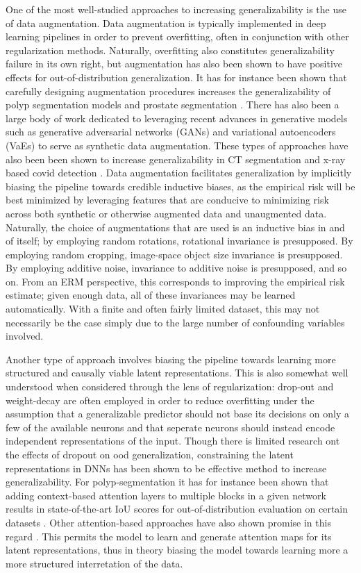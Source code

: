 	One of the most well-studied approaches to increasing generalizability is the use of data augmentation. Data augmentation is typically implemented in deep learning pipelines in order to prevent overfitting, often in conjunction with other regularization methods. Naturally, overfitting also constitutes generalizability failure in its own right, but augmentation has also been shown to have positive effects for out-of-distribution generalization. It has for instance been shown that carefully designing augmentation procedures increases the generalizability of polyp segmentation models \cite{polyp_augmentation} and prostate segmentation \cite{augmentation_prostate}. There has also been a large body of work dedicated to leveraging recent advances in generative models such as generative adversarial networks (GANs) and variational autoencoders (VaEs) to serve as synthetic data augmentation. These types of approaches have also been been shown to increase generalizability in CT segmentation \cite{cyclegan} and x-ray based covid detection \cite{covid}. Data augmentation facilitates generalization by implicitly biasing the pipeline towards credible inductive biases, as the empirical risk will be best minimized by leveraging features that are conducive to minimizing risk across both synthetic or otherwise augmented data and unaugmented data. Naturally, the choice of augmentations that are used is an inductive bias in and of itself; by employing random rotations, rotational invariance is presupposed. By employing random cropping, image-space object size invariance is presupposed. By employing additive noise, invariance to additive noise is presupposed, and so on. From an ERM perspective, this corresponds to improving the empirical risk estimate; given enough data, all of these invariances may be learned automatically. With a finite and often fairly limited dataset, this may not necessarily be the case simply due to the large number of confounding variables involved. 

	Another type of approach involves biasing the pipeline towards learning more structured and causally viable latent representations. This is also somewhat well understood when considered through the lens of regularization: drop-out and weight-decay are often employed in order to reduce overfitting under the assumption that a generalizable predictor should not base its decisions on only a few of the available neurons and that seperate neurons should instead encode independent representations of the input. Though there is limited research ont the effects of dropout on ood generalization, constraining the latent representations in DNNs has been shown to be effective method to increase generalizability. For polyp-segmentation it has for instance been shown that adding context-based attention layers to multiple blocks in a given network results in state-of-the-art IoU scores for out-of-distribution evaluation on certain datasets \cite{uacanet}. Other attention-based approaches have also shown promise in this regard \cite{attention_generalizability, reverse_attention}. This permits the model to learn and generate attention maps for its latent representations, thus in theory biasing the model towards learning more a more structured interretation of the data. 
	

